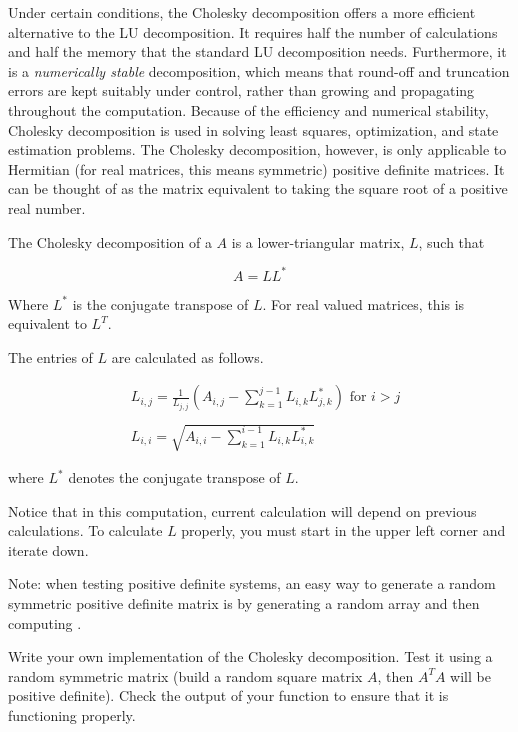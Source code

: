 Under certain conditions, the Cholesky decomposition offers a more efficient alternative to the LU decomposition.
It requires half the number of calculations and half the memory that the standard LU decomposition needs.
Furthermore, it is a \emph{numerically stable} decomposition, which means that round-off and truncation errors are kept suitably under control, rather than growing and propagating throughout the computation.
Because of the efficiency and numerical stability, Cholesky decomposition is used in solving least squares, optimization, and state estimation problems.
The Cholesky decomposition, however, is only applicable to Hermitian (for real matrices, this means symmetric) positive definite matrices.
It can be thought of as the matrix equivalent to taking the square root of a positive real number.

The Cholesky decomposition of a $A$ is a lower-triangular matrix, $L$, such that

\begin{equation*}
 A = LL^*
\end{equation*}

Where $L^*$ is the conjugate transpose of $L$.
For real valued matrices, this is equivalent to $L^T$.

The entries of $L$ are calculated as follows.

\begin{align*}
&L_{i,j} = \frac{1}{L_{j,j}}\left(A_{i,j} -\sum_{k=1}^{j-1}{L_{i,k}L_{j,k}^*}\right) \mbox{ for $i>j$} \\ \\
&L_{i,i} = \sqrt{A_{i,i} - \sum_{k=1}^{i-1}{L_{i,k}L_{i,k}^*}}
\end{align*}

where $L^*$ denotes the conjugate transpose of $L$.

Notice that in this computation, current calculation will depend on previous calculations. To calculate $L$ properly, you must start in the upper left corner and iterate down.

Note: when testing positive definite systems, an easy way to generate a random symmetric positive definite matrix is by generating a random array  and then computing .

\begin{problem}
Write your own implementation of the Cholesky decomposition.
Test it using a random symmetric matrix (build a random square matrix $A$, then $A^TA$ will be positive definite).
Check the output of your function to ensure that it is functioning properly.
\end{problem}


